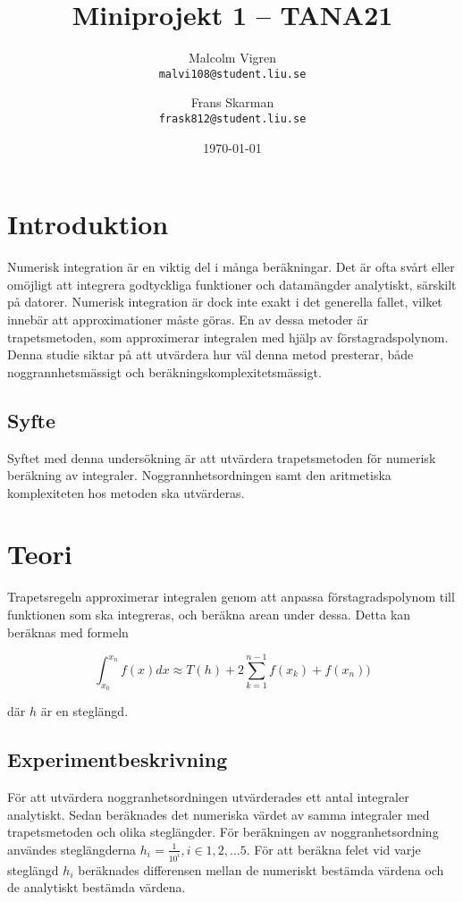 \documentclass[a4paper,titlepage]{article}
\title{
    \textbf{Miniprojekt 1 -- TANA21}}
\date{\today}
\author{%
    Malcolm Vigren \\
    \texttt{malvi108@student.liu.se}
    \and
    Frans Skarman\\
    \texttt{frask812@student.liu.se}
    }
\begin{document}
\maketitle
\newpage
\tableofcontents
\newpage

\section{Introduktion}
Numerisk integration är en viktig del i många beräkningar. Det är ofta svårt
eller omöjligt att integrera godtyckliga funktioner och datamängder analytiskt,
särskilt på datorer. Numerisk integration är dock inte exakt i det generella
fallet, vilket innebär att approximationer måste göras. En av dessa metoder
är trapetsmetoden, som approximerar integralen med hjälp av förstagradspolynom.
Denna studie siktar på att utvärdera hur väl denna metod presterar,
både noggrannhetsmässigt och beräkningskomplexitetsmässigt.

\subsection{Syfte}
Syftet med denna undersökning är att utvärdera trapetsmetoden för numerisk
beräkning av integraler. Noggrannhetsordningen samt den aritmetiska
komplexiteten hos metoden ska utvärderas.

\section{Teori}
Trapetsregeln approximerar integralen genom att anpassa förstagradspolynom till
funktionen som ska integreras, och beräkna arean under dessa. Detta kan
beräknas med formeln

\begin{equation}
    \int_{x_0}^{x_n}f(x)dx \approx T(h) +
    2\sum_{k=1}^{n-1}f(x_k) + f(x_n))
\end{equation}

där $h$ är en steglängd.

\subsection{Experimentbeskrivning}

För att utvärdera noggranhetsordningen utvärderades ett antal integraler
analytiskt. Sedan beräknades det numeriska värdet av samma integraler med
trapetsmetoden och olika steglängder. För beräkningen av noggranhetsordning
användes steglängderna $h_i = \frac{1}{10^i}, i \in {1,2, \dots 5}$.
För att beräkna felet vid varje steglängd $h_i$ beräknades differensen mellan de numeriskt
bestämda värdena och de analytiskt bestämda värdena.
\end{document}
